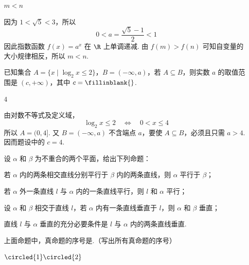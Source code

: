 \begin{answer}
\(m<n\)
\end{answer}

\begin{solution}
因为 \(1<\sqrt5<3\)，所以
\[
0<a=\frac{\sqrt5-1}{2}<1
\]
因此指数函数 \(f(x)=a^x\) 在 \(\R\) 上单调递减. 由 \(f(m)>f(n)\) 可知自变量的大小规律相反，所以 \(m<n\).
\end{solution}

\begin{problem}
已知集合 \(A=\{x\mid \log_2 x\le2\}\)，\(B=(-\infty,a)\)，若 \(A\subseteq B\)，则实数 \(a\) 的取值范围是 \((c,+\infty)\)，其中 \(c=\fillinblank{}\).
\end{problem}

\begin{answer}
\(4\)
\end{answer}

\begin{solution}
由对数不等式及定义域，
\[
\log_2x\le2\quad\Longleftrightarrow\quad 0<x\le4
\]
所以 \(A=(0,4]\). 又 \(B=(-\infty,a)\) 不含端点 \(a\)，要使 \(A\subseteq B\)，必须且只需 \(a>4\). 因而题设中的 \(c=4\).
\end{solution}

\begin{problem}
设 \(\alpha\) 和 \(\beta\) 为不重合的两个平面，给出下列命题：

\begin{circlelist}
\item 若 \(\alpha\) 内的两条相交直线分别平行于 \(\beta\) 内的两条直线，则 \(\alpha\) 平行于 \(\beta\)；
\item 若 \(\alpha\) 外一条直线 \(l\) 与 \(\alpha\) 内的一条直线平行，则 \(l\) 和 \(\alpha\) 平行；
\item 设 \(\alpha\) 和 \(\beta\) 相交于直线 \(l\)，若 \(\alpha\) 内有一条直线垂直于 \(l\)，则 \(\alpha\) 和 \(\beta\) 垂直；
\item 直线 \(l\) 与 \(\alpha\) 垂直的充分必要条件是 \(l\) 与 \(\alpha\) 内的两条直线垂直.
\end{circlelist}

上面命题中，真命题的序号是\fillinblank{}.（写出所有真命题的序号）
\end{problem}

\begin{answer}
\(\circled{1}\circled{2}\)
\end{answer}

